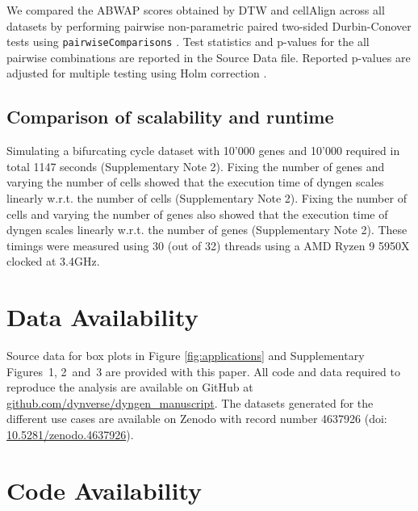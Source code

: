 \documentclass[10pt, a4paper]{article}
\begin{document}
We compared the ABWAP scores obtained by DTW and cellAlign across all
datasets by performing pairwise non-parametric paired two-sided
Durbin-Conover tests
\cite{conover_multiplecomparisonsprocedures_1979} using
\texttt{pairwiseComparisons}
\cite{patil_pairwisecomparisonsmultiplepairwise_2019}. Test
statistics and p-values for the all pairwise combinations are reported
in the Source Data file. Reported p-values are adjusted for multiple
testing using Holm correction
\cite{holm_simplesequentiallyrejective_1979}.

\hypertarget{comparison-of-scalability-and-runtime}{%
	\subsection{Comparison of scalability and
		runtime}\label{comparison-of-scalability-and-runtime}}

Simulating a bifurcating cycle dataset with 10'000 genes and 10'000
required in total 1147 seconds (Supplementary Note 2). Fixing the number
of genes and varying the number of cells showed that the execution time
of dyngen scales linearly w.r.t. the number of cells (Supplementary Note
2). Fixing the number of cells and varying the number of genes also
showed that the execution time of dyngen scales linearly w.r.t. the
number of genes (Supplementary Note 2). These timings were measured
using 30 (out of 32) threads using a AMD Ryzen 9 5950X clocked at
3.4GHz.

\hypertarget{data-availability}{%
	\section{Data Availability}\label{data-availability}}

Source data for box plots in Figure \ref{fig:applications} and
Supplementary Figures~1, 2~and~3 are provided with this paper. All code
and data required to reproduce the analysis are available on GitHub at
\href{https://github.com/dynverse/dyngen_manuscript}{github.com/dynverse/dyngen\_manuscript}.
The datasets generated for the different use cases are available on
Zenodo with record number 4637926 (doi:
\href{https://doi.org/10.5281/zenodo.4637926}{10.5281/zenodo.4637926}).

\hypertarget{code-availability}{%
	\section{Code Availability}\label{code-availability}}
\end{document}
